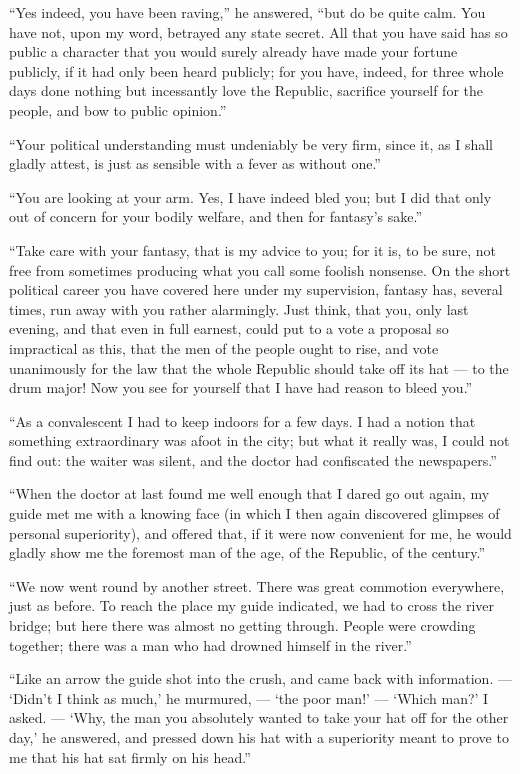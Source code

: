 \documentclass[12pt,a4paper]{book}
\begin{document}
``Yes indeed, you have been raving,'' he answered, ``but do be quite calm. You have not, upon my word, betrayed any state secret. All that you have said has so public a character that you would surely already have made your fortune publicly, if it had only been heard publicly; for you have, indeed, for three whole days done nothing but incessantly love the Republic, sacrifice yourself for the people, and bow to public opinion.''

``Your political understanding must undeniably be very firm, since it, as I shall gladly attest, is just as sensible with a fever as without one.''

``You are looking at your arm. Yes, I have indeed bled you; but I did that only out of concern for your bodily welfare, and then for fantasy's sake.''

``Take care with your fantasy, that is my advice to you; for it is, to be sure, not free from sometimes producing what you call some foolish nonsense. On the short political career you have covered here under my supervision, fantasy has, several times, run away with you rather alarmingly. Just think, that you, only last evening, and that even in full earnest, could put to a vote a proposal so impractical as this, that the men of the people ought to rise, and vote unanimously for the law that the whole Republic should take off its hat --- to the drum major! Now you see for yourself that I have had reason to bleed you.''

``As a convalescent I had to keep indoors for a few days. I had a notion that something extraordinary was afoot in the city; but what it really was, I could not find out: the waiter was silent, and the doctor had confiscated the newspapers.''

``When the doctor at last found me well enough that I dared go out again, my guide met me with a knowing face (in which I then again discovered glimpses of personal superiority), and
offered that, if it were now convenient for me, he would gladly show me the foremost man of the age, of the Republic, of the century.''

``We now went round by another street. There was great commotion everywhere, just as before. To reach the place my guide indicated, we had to cross the river bridge; but here there was almost no getting through. People were crowding together; there was a man who had drowned himself in the river.''

``Like an arrow the guide shot into the crush, and came back with information. --- `Didn't I think as much,' he murmured, --- `the poor man!' --- `Which man?' I asked. --- `Why, the man you absolutely wanted to take your hat off for the other day,' he answered, and pressed down his hat with a superiority meant to prove to me that his hat sat firmly on his head.''
\end{document}
